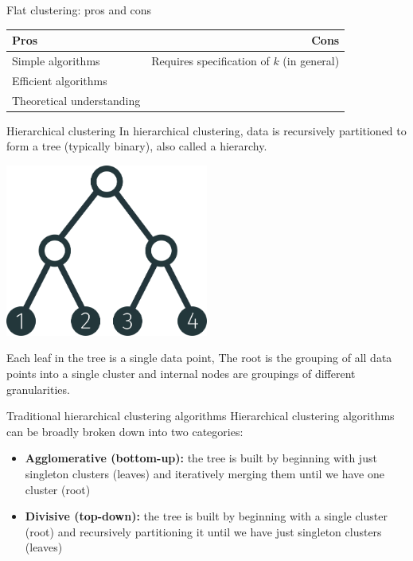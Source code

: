 \documentclass[10pt, compress]{beamer}
\begin{document}
\begin{frame}{Flat clustering: pros and cons}
  \begin{table}
    \begin{tabular}{lr}
      \toprule
      Pros & Cons \\
      \midrule
      Simple algorithms &  Requires specification of $k$ (in general)\\
      Efficient algorithms & \\
      Theoretical understanding & \\
      \bottomrule
    \end{tabular}
  \end{table}
\end{frame}

\begin{frame}{Hierarchical clustering}
  In \alert{hierarchical clustering}, data
  is recursively partitioned to form a tree (typically binary),
  also called a hierarchy.

  \begin{center}
    \includegraphics[width=0.5\textwidth]{img/tree-1234-balanced}
  \end{center}

  \pause

  Each leaf in the tree is a single data point,
  The root is the grouping of all data points
  into a single cluster and internal nodes
  are groupings of different granularities.
\end{frame}

\begin{frame}{Traditional hierarchical clustering algorithms}
  Hierarchical clustering algorithms can be broadly broken
  down into two categories:

  \begin{itemize}
    \item<2-> \textbf{Agglomerative (bottom-up):} the tree is built by
      beginning with just singleton clusters (leaves) and
      iteratively merging them until we have one cluster (root)
    \item<3-> \textbf{Divisive (top-down):} the tree is built
      by beginning with a single cluster (root) and
      recursively partitioning it until we
      have just singleton clusters (leaves)
  \end{itemize}
\end{frame}
\end{document}
